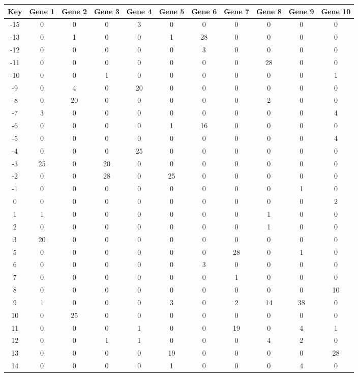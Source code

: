 \begin{tabular}{|c|c|c|c|c|c|c|c|c|c|c|}
\hline
Key & Gene 1 & Gene 2 & Gene 3 & Gene 4 & Gene 5 & Gene 6 & Gene 7 & Gene 8 & Gene 9 & Gene 10 \\
\hline
-15 & 0 & 0 & 0 & 3 & 0 & 0 & 0 & 0 & 0 & 0 \\
-13 & 0 & 1 & 0 & 0 & 1 & 28 & 0 & 0 & 0 & 0 \\
-12 & 0 & 0 & 0 & 0 & 0 & 3 & 0 & 0 & 0 & 0 \\
-11 & 0 & 0 & 0 & 0 & 0 & 0 & 0 & 28 & 0 & 0 \\
-10 & 0 & 0 & 1 & 0 & 0 & 0 & 0 & 0 & 0 & 1 \\
-9 & 0 & 4 & 0 & 20 & 0 & 0 & 0 & 0 & 0 & 0 \\
-8 & 0 & 20 & 0 & 0 & 0 & 0 & 0 & 2 & 0 & 0 \\
-7 & 3 & 0 & 0 & 0 & 0 & 0 & 0 & 0 & 0 & 4 \\
-6 & 0 & 0 & 0 & 0 & 1 & 16 & 0 & 0 & 0 & 0 \\
-5 & 0 & 0 & 0 & 0 & 0 & 0 & 0 & 0 & 0 & 4 \\
-4 & 0 & 0 & 0 & 25 & 0 & 0 & 0 & 0 & 0 & 0 \\
-3 & 25 & 0 & 20 & 0 & 0 & 0 & 0 & 0 & 0 & 0 \\
-2 & 0 & 0 & 28 & 0 & 25 & 0 & 0 & 0 & 0 & 0 \\
-1 & 0 & 0 & 0 & 0 & 0 & 0 & 0 & 0 & 1 & 0 \\
0 & 0 & 0 & 0 & 0 & 0 & 0 & 0 & 0 & 0 & 2 \\
1 & 1 & 0 & 0 & 0 & 0 & 0 & 0 & 1 & 0 & 0 \\
2 & 0 & 0 & 0 & 0 & 0 & 0 & 0 & 1 & 0 & 0 \\
3 & 20 & 0 & 0 & 0 & 0 & 0 & 0 & 0 & 0 & 0 \\
5 & 0 & 0 & 0 & 0 & 0 & 0 & 28 & 0 & 1 & 0 \\
6 & 0 & 0 & 0 & 0 & 0 & 3 & 0 & 0 & 0 & 0 \\
7 & 0 & 0 & 0 & 0 & 0 & 0 & 1 & 0 & 0 & 0 \\
8 & 0 & 0 & 0 & 0 & 0 & 0 & 0 & 0 & 0 & 10 \\
9 & 1 & 0 & 0 & 0 & 3 & 0 & 2 & 14 & 38 & 0 \\
10 & 0 & 25 & 0 & 0 & 0 & 0 & 0 & 0 & 0 & 0 \\
11 & 0 & 0 & 0 & 1 & 0 & 0 & 19 & 0 & 4 & 1 \\
12 & 0 & 0 & 1 & 1 & 0 & 0 & 0 & 4 & 2 & 0 \\
13 & 0 & 0 & 0 & 0 & 19 & 0 & 0 & 0 & 0 & 28 \\
14 & 0 & 0 & 0 & 0 & 1 & 0 & 0 & 0 & 4 & 0 \\
\hline
\end{tabular}